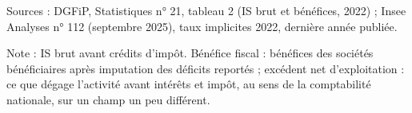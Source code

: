 Sources : DGFiP, Statistiques n° 21, tableau 2 (IS brut et bénéfices, 2022) ; Insee Analyses n° 112 (septembre 2025), taux implicites 2022, dernière année publiée.\par Note : IS brut avant crédits d'impôt. Bénéfice fiscal : bénéfices des sociétés bénéficiaires après imputation des déficits reportés ; excédent net d'exploitation : ce que dégage l'activité avant intérêts et impôt, au sens de la comptabilité nationale, sur un champ un peu différent.
